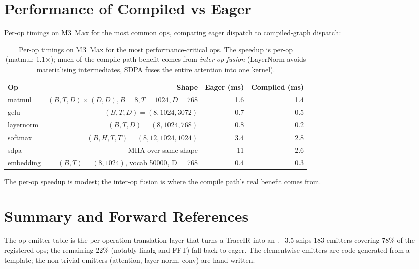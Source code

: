 \section{Performance of Compiled vs Eager}
\label{sec:op_emitters:perf}

Per-op timings on M3~Max for the most common ops, comparing
eager dispatch to compiled-graph dispatch:

\begin{table}[t]
\centering
\small
\begin{tabular}{lrrr}
\toprule
Op & Shape & Eager (ms) & Compiled (ms) \\
\midrule
matmul    & $(B, T, D) \times (D, D), B = 8, T = 1024, D = 768$ & 1.6 & 1.4 \\
gelu      & $(B, T, D) = (8, 1024, 3072)$                       & 0.7 & 0.5 \\
layernorm & $(B, T, D) = (8, 1024, 768)$                        & 0.8 & 0.2 \\
softmax   & $(B, H, T, T) = (8, 12, 1024, 1024)$                & 3.4 & 2.8 \\
sdpa      & MHA over same shape                                  & 11  & 2.6 \\
embedding & $(B, T) = (8, 1024)$, vocab 50000, D = 768           & 0.4 & 0.3 \\
\bottomrule
\end{tabular}
\caption[Per-op compile speedup.]{Per-op timings on M3~Max for
the most performance-critical ops. The speedup is per-op
(matmul: 1.1$\times$); much of the compile-path benefit comes
from \emph{inter-op fusion} (LayerNorm avoids materialising
intermediates, SDPA fuses the entire attention into one kernel).}
\label{tab:op_emitters:perf}
\end{table}

The per-op speedup is modest; the inter-op fusion is where the
compile path's real benefit comes from.

\section{Summary and Forward References}
\label{sec:op_emitters:summary}

The op emitter table is the per-operation translation layer
that turns a TraceIR into an \MPSGraph. \Lucid\ 3.5 ships 183
emitters covering 78\% of the registered ops; the remaining 22\%
(notably linalg and FFT) fall back to eager. The elementwise
emitters are code-generated from a template; the non-trivial
emitters (attention, layer norm, conv) are hand-written.

